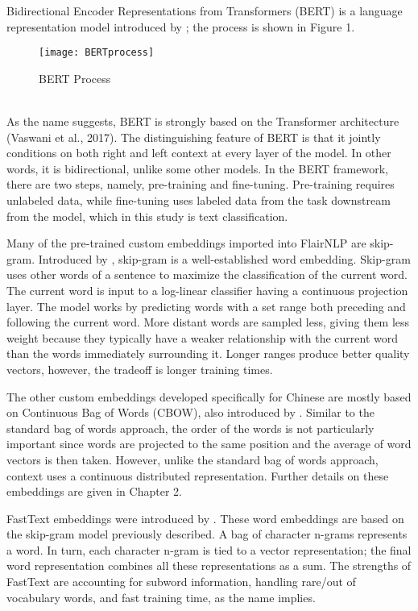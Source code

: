 \documentclass [11pt, proquest] {uwthesis}[2020/02/24]
\begin{document}
Bidirectional Encoder Representations from Transformers (BERT) is a language representation model introduced by \cite{Devlin2018}; the process is shown in Figure 1.
\begin{figure}[hbt!]
\begin{center}
\texttt{[image: BERTprocess]}
\end{center}
\caption{BERT Process \citep{Devlin2018}}
\end{figure}
\\As the name suggests, BERT is strongly based on the Transformer architecture (Vaswani et al., 2017). The distinguishing feature of BERT is that it jointly conditions on both right and left context at every layer of the model. In other words, it is bidirectional, unlike some other models. In the BERT framework, there are two steps, namely, pre-training and fine-tuning. Pre-training requires unlabeled data, while fine-tuning uses labeled data from the task downstream from the model, which in this study is text classification. 

Many of the pre-trained custom embeddings imported into FlairNLP are skip-gram. Introduced by \cite{Mikolov2013}, skip-gram is a well-established word embedding. Skip-gram uses other words of a sentence to maximize the classification of the current word. The current word is input to a log-linear classifier having a continuous projection layer. The model works by predicting words with a set range both preceding and following the current word. More distant words are sampled less, giving them less weight because they typically have a weaker relationship with the current word than the words immediately surrounding it. Longer ranges produce better quality vectors, however, the tradeoff is longer training times. 

The other custom embeddings developed specifically for Chinese are mostly based on Continuous Bag of Words (CBOW), also introduced by \cite{Mikolov2013}. Similar to the standard bag of words approach, the order of the words is not particularly important since words are projected to the same position and the average of word vectors is then taken. However, unlike the standard bag of words approach, context uses a continuous distributed representation. Further details on these embeddings are given in Chapter 2.

FastText embeddings were introduced by \cite{Bojanowski2017}. These word embeddings are based on the skip-gram model previously described. A bag of character n-grams represents a word. In turn, each character n-gram is tied to a vector representation; the final word representation combines all these representations as a sum. The strengths of FastText are accounting for subword information, handling rare/out of vocabulary words, and fast training time, as the name implies.
\end{document}
